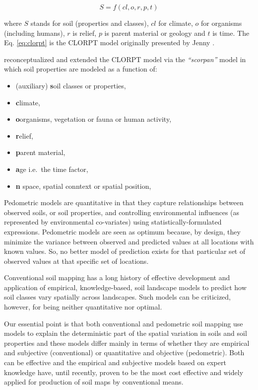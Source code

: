 \documentclass[graybox,natbib,nospthms,UStrade]{svmono}
\begin{document}
\begin{equation}
S = f (cl, o, r, p, t)
\label{eq:clorpt}
\end{equation}

where \(S\) stands for soil (properties and classes), \(cl\) for climate,
\(o\) for organisms (including humans), \(r\) is relief, \(p\) is parent
material or geology and \(t\) is time. The Eq. \eqref{eq:clorpt} is the
CLORPT model originally presented by Jenny \citeyearpar{jenny1994factors}.

\citet{MCBRATNEY20033} reconceptualized and extended the CLORPT model via the
\emph{``scorpan''} model in which soil properties are modeled as a function of:

\begin{itemize}
\item
  (auxiliary) \textbf{s}oil classes or properties,
\item
  \textbf{c}limate,
\item
  \textbf{o}organisms, vegetation or fauna or human activity,
\item
  \textbf{r}elief,
\item
  \textbf{p}arent material,
\item
  \textbf{a}ge i.e.~the time factor,
\item
  \textbf{n} space, spatial conntext or spatial position,
\end{itemize}

Pedometric models are quantitative in that they capture
relationships between observed soils, or soil properties, and
controlling environmental influences (as represented by environmental
co-variates) using statistically-formulated expressions. Pedometric
models are seen as optimum because, by design, they minimize the
variance between observed and predicted values at all locations with
known values. So, no better model of prediction exists for that
particular set of observed values at that specific set of locations.

Conventional soil mapping has a long history of effective development
and application of empirical, knowledge-based, soil landscape models to
predict how soil classes vary spatially across landscapes. Such models
can be criticized, however, for being neither quantitative nor optimal.

Our essential point is that both conventional and pedometric soil
mapping use models to explain the deterministic part of the spatial
variation in soils and soil properties and these models differ mainly in
terms of whether they are empirical and subjective (conventional) or
quantitative and objective (pedometric). Both can be effective and the
empirical and subjective models based on expert knowledge have, until
recently, proven to be the most cost effective and widely applied for
production of soil maps by conventional means.
\end{document}
